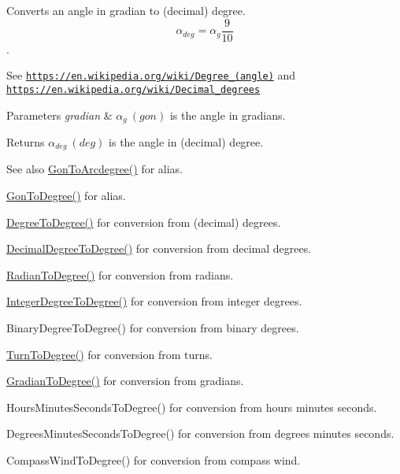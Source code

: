 Converts an angle in gradian to (decimal) degree. \[\alpha_{deg}=\alpha_{g}\frac{9}{10}\]. 

See \href{https://en.wikipedia.org/wiki/Degree_(angle)}{\tt https\+://en.\+wikipedia.\+org/wiki/\+Degree\+\_\+(angle)} and \href{https://en.wikipedia.org/wiki/Decimal_degrees}{\tt https\+://en.\+wikipedia.\+org/wiki/\+Decimal\+\_\+degrees} 
\begin{DoxyParams}{Parameters}
{\em gradian} & $\alpha_{g}\ (gon)$ is the angle in gradians. \\
\hline
\end{DoxyParams}
\begin{DoxyReturn}{Returns}
$\alpha_{deg}\ (deg)$ is the angle in (decimal) degree. 
\end{DoxyReturn}
\begin{DoxySeeAlso}{See also}
\mbox{\hyperlink{group___e_g_x_math-_angle_conversions-_gon_ga00757282768841abe48ac3c8452627cb}{Gon\+To\+Arcdegree()}} for alias. 

\mbox{\hyperlink{group___e_g_x_math-_angle_conversions-_gon_gaf1c40076eaf3be4e070ff34045db55d1}{Gon\+To\+Degree()}} for alias. 

\mbox{\hyperlink{group___e_g_x_math-_angle_conversions-_degree_gaca157e7d3e99a46a11a04b92680d2574}{Degree\+To\+Degree()}} for conversion from (decimal) degrees. 

\mbox{\hyperlink{group___e_g_x_math-_angle_conversions-_decimal_degree_ga0aa7f2f5dbb00cf4ab303421c6e33ccf}{Decimal\+Degree\+To\+Degree()}} for conversion from decimal degrees. 

\mbox{\hyperlink{group___e_g_x_math-_angle_conversions-_radian_ga25bbce6cdc1c3621f2a158d320e3bc45}{Radian\+To\+Degree()}} for conversion from radians. 

\mbox{\hyperlink{group___e_g_x_math-_angle_conversions-_integer_degree_gaa9b63c6095fd7f8809fcfa2ba1e62235}{Integer\+Degree\+To\+Degree()}} for conversion from integer degrees. 

Binary\+Degree\+To\+Degree() for conversion from binary degrees. 

\mbox{\hyperlink{group___e_g_x_math-_angle_conversions-_turn_ga19eceb6db54a1cf17789639c2a869cb9}{Turn\+To\+Degree()}} for conversion from turns. 

\mbox{\hyperlink{group___e_g_x_math-_angle_conversions-_gradian_gaa284952274f16d225951cf5139d0ff4e}{Gradian\+To\+Degree()}} for conversion from gradians. 

Hours\+Minutes\+Seconds\+To\+Degree() for conversion from hours minutes seconds. 

Degrees\+Minutes\+Seconds\+To\+Degree() for conversion from degrees minutes seconds. 

Compass\+Wind\+To\+Degree() for conversion from compass wind. 
\end{DoxySeeAlso}
\mbox{\label{group___e_g_x_math-_angle_conversions-_gon_gabd1dfe541d8caf9ee5ed261fe6f08261}} 
